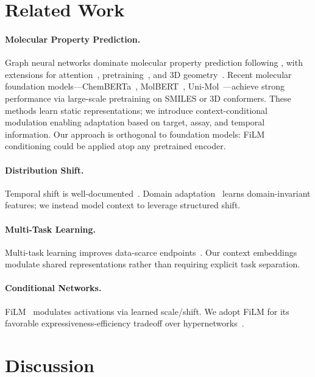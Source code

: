 \documentclass[sigconf]{acmart}
\begin{document}
\section{Related Work}
\label{sec:related}

\paragraph{Molecular Property Prediction.}
Graph neural networks dominate molecular property prediction following \cite{gilmer_2017_mpnn}, with extensions for attention~\cite{xiong_2020_attentivefp}, pretraining~\cite{rong_2020_grover, hu_2020_gnn_pretrain}, and 3D geometry~\cite{schutt_2017_schnet, gasteiger_2020_dimenet}. Recent molecular foundation models---ChemBERTa~\cite{chithrananda_2020_chemberta}, MolBERT~\cite{fabian_2020_molbert}, Uni-Mol~\cite{zhou_2023_unimol}---achieve strong performance via large-scale pretraining on SMILES or 3D conformers. These methods learn static representations; we introduce context-conditional modulation enabling adaptation based on target, assay, and temporal information. Our approach is orthogonal to foundation models: FiLM conditioning could be applied atop any pretrained encoder.

\paragraph{Distribution Shift.}
Temporal shift is well-documented~\cite{sheridan_2013_time_split, martin_2019_temporal}. Domain adaptation~\cite{ben_david_2010_theory} learns domain-invariant features; we instead model context to leverage structured shift.

\paragraph{Multi-Task Learning.}
Multi-task learning improves data-scarce endpoints~\cite{ramsundar_2015_massively}. Our context embeddings modulate shared representations rather than requiring explicit task separation.

\paragraph{Conditional Networks.}
FiLM~\cite{perez_2018_film} modulates activations via learned scale/shift. We adopt FiLM for its favorable expressiveness-efficiency tradeoff over hypernetworks~\cite{ha_2017_hypernetworks}.

\section{Discussion}
\label{sec:discussion}
\end{document}
